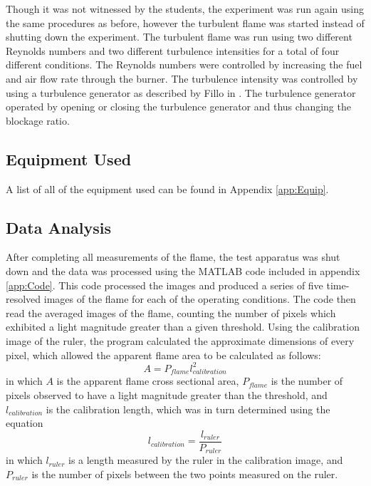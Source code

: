 \documentclass[12pt]{ussci} %
\begin{document}
Though it was not witnessed by the students, the experiment was run again using the same procedures as before, however the turbulent flame was started instead of shutting down the experiment.  The turbulent flame was run using two different Reynolds numbers and two different turbulence intensities for a total of four different conditions.  The Reynolds numbers were controlled by increasing the fuel and air flow rate through the burner.  The turbulence intensity was controlled by using a turbulence generator as described by Fillo in \cite{Fillo2015}.  The turbulence generator operated by opening or closing the turbulence generator and thus changing the blockage ratio.


\subsection{Equipment Used}
A list of all of the equipment used can be found in Appendix \ref{app:Equip}.


\subsection{Data Analysis}
After completing all measurements of the flame, the test apparatus was shut down and the data was processed using the MATLAB code included in appendix \ref{app:Code}.  This code processed the images and produced a series of five time-resolved images of the flame for each of the operating conditions.  The code then read the averaged images of the flame, counting the number of pixels which exhibited a light magnitude greater than a given threshold.  Using the calibration image of the ruler, the program calculated the approximate dimensions of every pixel, which allowed the apparent flame area to be calculated as follows:
\begin{equation}
A = P_{flame}l_{calibration}^2
\end{equation}
in which $A$ is the apparent flame cross sectional area, $P_{flame}$ is the number of pixels observed to have a light magnitude greater than the threshold, and $l_{calibration}$ is the calibration length, which was in turn determined using the equation
\begin{equation}
l_{calibration} = \frac{l_{ruler}}{P_{ruler}}
\end{equation}
in which $l_{ruler}$ is a length measured by the ruler in the calibration image, and $P_{ruler}$ is the number of pixels between the two points measured on the ruler.
\end{document}
